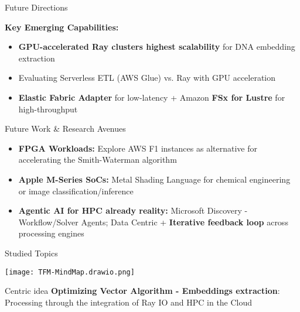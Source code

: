 \documentclass[aspectratio=169]{beamer}
\begin{document}
\begin{frame}{Future Directions}

            \textbf{Key Emerging Capabilities:}
            \begin{itemize}

                \item \textcolor{rayblue}{\textbf{GPU-accelerated Ray clusters highest scalability}} for DNA embedding extraction
                \item Evaluating Serverless ETL (AWS Glue) vs. Ray with GPU acceleration
                \item \textbf{Elastic Fabric Adapter} for low-latency + Amazon \textbf{FSx for Lustre} for high-throughput
            \end{itemize}

    
    \vspace{0.3cm}
    \begin{block}{Future Work \& Research Avenues}
        \begin{itemize}
            \item \textbf{FPGA Workloads:} Explore AWS F1 instances as alternative for accelerating the Smith-Waterman algorithm
            \item \textbf{Apple M-Series SoCs:} Metal Shading Language for chemical engineering or image classification/inference
            \item \textbf{Agentic AI for HPC already reality:} Microsoft Discovery - Workflow/Solver Agents; Data Centric + \textbf{Iterative feedback loop} across processing engines
        \end{itemize}
    \end{block}
\end{frame}

\begin{frame}{Studied Topics}
    \begin{center}
        \texttt{[image: TFM-MindMap.drawio.png]}
    \end{center}
    
    \vspace{0.3cm}
    \begin{block}{Centric idea}
        \textbf{Optimizing Vector Algorithm - Embeddings extraction}:  Processing through the integration of Ray IO and HPC in the Cloud
    \end{block}
\end{frame}
\end{document}
